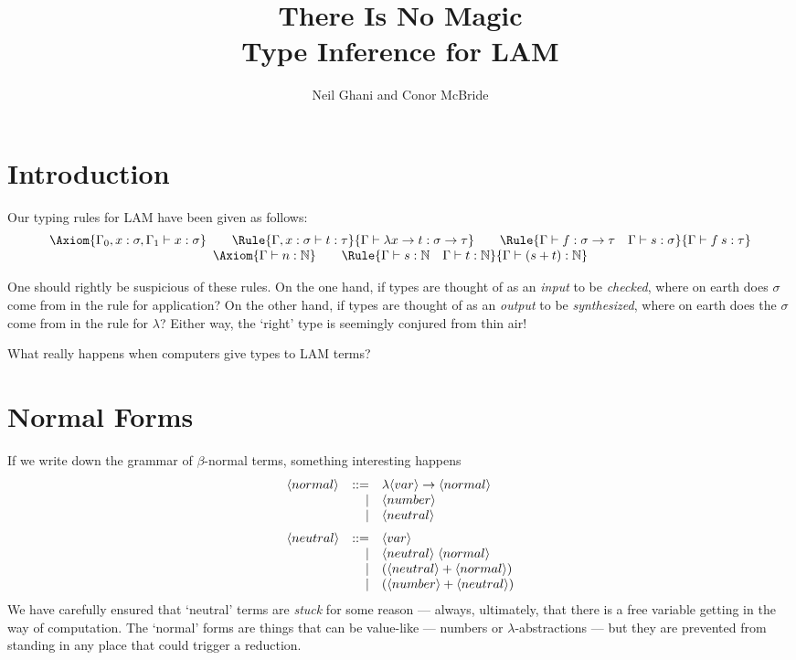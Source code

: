 \documentclass{article}
\begin{document}
\title{There Is No Magic \\
  Type Inference for LAM}
\author{Neil Ghani and Conor McBride}
\maketitle

\newcommand{\Nat}{\mathbb{N}}
\newcommand{\fbx}[1]{\framebox{\ensuremath{#1}}}
\newcommand{\NT}[1]{\langle #1 \rangle}
  
\section{Introduction}

Our typing rules for LAM have been given as follows:
\[\begin{array}{c}
    \Axiom{\Gamma_0,x:\sigma,\Gamma_1 \vdash x:\sigma}\qquad
    \Rule{\Gamma,x:\sigma\vdash t:\tau}
    {\Gamma\vdash \lambda x \to t : \sigma \to \tau}\qquad
    \Rule{\Gamma\vdash f:\sigma\to\tau\quad \Gamma\vdash s:\sigma}
    {\Gamma\vdash f\:s : \tau}
    \\
    \Axiom{\Gamma\vdash n:\Nat} \qquad
    \Rule{\Gamma\vdash s:\Nat\quad\Gamma\vdash t:\Nat}
      {\Gamma\vdash (s+t) : \Nat}
\end{array}\]

One should rightly be suspicious of these rules. On the one hand,
if types are thought of as an \emph{input} to be \emph{checked},
where on earth does $\sigma$ come from in the rule for application?
On the other hand, if types are thought of as an \emph{output} to be
\emph{synthesized}, where on earth does the $\sigma$ come from in
the rule for $\lambda$? Either way, the `right' type is seemingly conjured
from thin air!

What really happens when computers give types to LAM terms?


\section{Normal Forms}

If we write down the grammar of $\beta$-normal terms, something
interesting happens
\[\begin{array}{lrl}
    \NT{normal} & ::= & \lambda \NT{var} \to \NT{normal} \\
    & | & \NT{number} \\
    & | & \NT{neutral} \medskip \\
    \NT{neutral} & ::= & \NT{var} \\
   & | &  \NT{neutral} \;  \NT{normal} \\
   & | &  (\NT{neutral} +  \NT{normal}) \\
   & | &  (\NT{number} +  \NT{neutral}) \\
\end{array}  \]
We have carefully ensured that `neutral' terms are \emph{stuck}
for some reason --- always, ultimately, that there is a free
variable getting in the way of computation. The `normal' forms
are things that can be value-like --- numbers or $\lambda$-abstractions ---
but they are prevented from standing in any place that could trigger
a reduction.
\end{document}
